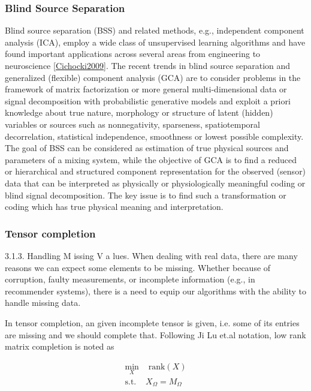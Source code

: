 \documentclass[letterpaper,12pt]{article}
\begin{document}
 \subsubsection{Blind Source Separation}
 
Blind source separation (BSS) and related methods, e.g., independent component analysis (ICA), employ a wide class of unsupervised learning algorithms and have found important applications across several areas from engineering to neuroscience \ref{Cichocki2009}. The recent trends in blind source separation and generalized (flexible) component analysis (GCA) are to consider problems in the framework of matrix factorization or more general multi-dimensional data or signal decomposition with probabilistic generative models and exploit a priori knowledge about true nature, morphology or structure of latent (hidden) variables or sources such as nonnegativity, sparseness, spatiotemporal decorrelation, statistical independence, smoothness or lowest possible complexity. The goal of BSS can be considered as estimation of true physical sources and parameters of a mixing system, while the objective of GCA is to find a reduced or hierarchical and structured component representation for the observed (sensor) data that can be interpreted as physically or physiologically meaningful coding or blind signal decomposition. The key issue is to find such a transformation or coding which has true physical meaning and interpretation.

 \subsubsection{Tensor completion}
 
 3.1.3. Handling M issing V a lues. When dealing with real data, there are many reasons we can expect some elements to be missing. Whether because of corruption, faulty measurements, or incomplete information (e.g., in recommender systems), there is a need to equip our algorithms with the ability to handle missing data.\cite{Papalexakis2016}
 
 In tensor completion, an given incomplete tensor is given, i.e. some of its entries are missing and we should complete that. Following Ji Lu et.al \cite{Liu2013} notation,  low rank matrix completion is noted as

\begin{equation} 
 \begin{split}
  \min_X & \text{ rank}(X)\\
  \text{s.t. } & X_\Omega = M_\Omega
 \end{split}
\end{equation}
\end{document}
